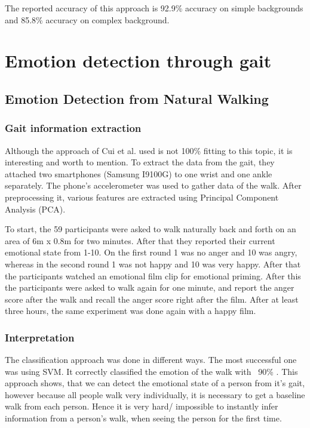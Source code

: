 \documentclass[conference]{IEEEtran}
\begin{document}
The reported accuracy of this approach is 92.9\% accuracy on simple backgrounds and 85.8\% accuracy on complex background.

\section{Emotion detection through gait}
\label{sec:emotionGait}
\subsection{Emotion Detection from Natural Walking}
\label{subsec:EDNW}
\subsubsection{Gait information extraction}
Although the approach of Cui et al.\cite{cui2016emotion} used is not 100\% fitting to this topic, it is interesting and worth to mention. To extract the data from the gait, they attached two smartphones (Samsung I9100G) to one wrist and one ankle separately\cite{cui2016emotion}.  The phone's accelerometer was used to gather data of the walk. After preprocessing it, various features are extracted using Principal Component Analysis (PCA)\cite{cui2016emotion}.\

To start, the 59 participants were asked to walk naturally back and forth on an area of 6m x 0.8m for two minutes\cite{cui2016emotion}. After that they reported their current emotional state from 1-10\cite{cui2016emotion}. On the first round 1 was no anger and 10 was angry, whereas in the second round 1 was not happy and 10 was very happy.  After that the participants watched an emotional film clip for emotional priming\cite{cui2016emotion}. After this the participants were asked to walk again for one minute, and report the anger score after the walk and recall the anger score right after the film\cite{cui2016emotion}.  After at least three hours, the same experiment was done again with a happy film. 
\subsubsection{Interpretation}
The classification approach was done in different ways. The most successful one was using SVM. It correctly classified the emotion of the walk with ~90\% \cite{cui2016emotion}. 
This approach shows, that we can detect the emotional state of a person from it's gait, however because all people walk very individually, it is necessary to get a baseline walk from each person. Hence it is very hard/ impossible to instantly infer information from a person's walk, when seeing the person for the first time.
\end{document}
